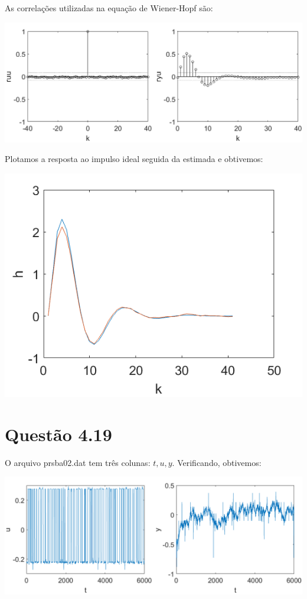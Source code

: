 \documentclass{rbfin}
\begin{document}
As correlações utilizadas na equação de Wiener-Hopf são:

\begin{center}
\includegraphics[scale=0.65]{3r}
\end{center}

\newpage

Plotamos a resposta ao impulso ideal seguida da estimada e obtivemos:

\begin{center}
\includegraphics[scale=0.666]{3h}
\end{center}

\section*{Questão 4.19}

O arquivo prsba02.dat tem três colunas: $t,u,y$. Verificando, obtivemos:

\begin{center}
\includegraphics[scale=0.65]{4uy}
\end{center}
\end{document}
